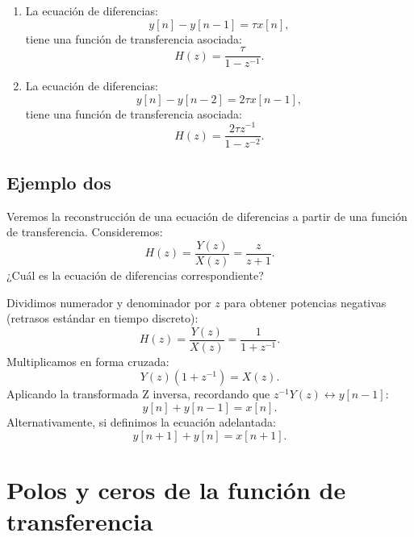 \begin{enumerate}
	\item La ecuaci\'{o}n de diferencias:
	\begin{equation}
		y[n] - y[n-1] = \tau x[n],
	\end{equation}
	tiene una funci\'{o}n de transferencia asociada:
	\begin{equation}
		H(z) = \frac{\tau}{1-z^{-1}}.
	\end{equation}
	
	\item La ecuaci\'{o}n de diferencias:
	\begin{equation}
		y[n] - y[n-2] = 2 \tau x[n-1],
	\end{equation}
	tiene una funci\'{o}n de transferencia asociada:
	\begin{equation}
		H(z) = \frac{2 \tau z^{-1}}{1-z^{-2}}.
	\end{equation}
\end{enumerate}

\subsection{Ejemplo dos}

Veremos la reconstrucci\'{o}n de una ecuaci\'{o}n de diferencias a partir de una funci\'{o}n de transferencia. Consideremos:
\begin{equation}
	H(z) = \frac{Y(z)}{X(z)} = \frac{z}{z+1}.
\end{equation}
¿Cu\'{a}l es la ecuaci\'{o}n de diferencias correspondiente?

Dividimos numerador y denominador por $z$ para obtener potencias negativas (retrasos estándar en tiempo discreto):
\begin{equation}
	H(z) = \frac{Y(z)}{X(z)} = \frac{1}{1 + z^{-1}}.
\end{equation}
Multiplicamos en forma cruzada:
\begin{equation}
	Y(z) (1 + z^{-1}) = X(z).
\end{equation}
Aplicando la transformada Z inversa, recordando que $z^{-1} Y(z) \leftrightarrow y[n-1]$:
\begin{equation}
	y[n] + y[n-1] = x[n].
\end{equation}
Alternativamente, si definimos la ecuación adelantada:
\begin{equation}
	y[n+1] + y[n] = x[n+1].
\end{equation}

\section{Polos y ceros de la funci\'{o}n de transferencia}

